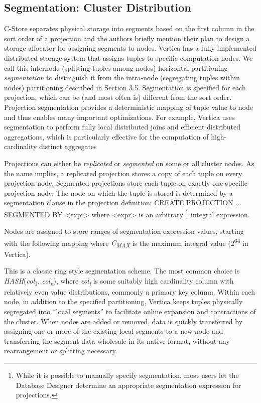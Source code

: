 \documentclass[a4paper,12pt,notitlepage,twoside,openright]{article}
\begin{document}
\hypertarget{segmentation-cluster-distribution}{%
\subsection{Segmentation: Cluster
Distribution}\label{segmentation-cluster-distribution}}

C-Store separates physical storage into segments based on the first
column in the sort order of a projection and the authors briefly mention
their plan to design a storage allocator for assigning segments to
nodes. Vertica has a fully implemented distributed storage system that
assigns tuples to specific computation nodes. We call this internode
(splitting tuples among nodes) horizontal partitioning
\emph{segmentation} to distinguish it from the intra-node (segregating
tuples within nodes) partitioning described in Section 3.5. Segmentation
is specified for each projection, which can be (and most often is)
different from the sort order. Projection segmentation provides a
deterministic mapping of tuple value to node and thus enables many
important optimizations. For example, Vertica uses segmentation to
perform fully local distributed joins and efficient distributed
aggregations, which is particularly effective for the computation of
high-cardinality distinct aggregates

Projections can either be \emph{replicated} or \emph{segmented} on some
or all cluster nodes. As the name implies, a replicated projection
stores a copy of each tuple on every projection node. Segmented
projections store each tuple on exactly one specific projection node.
The node on which the tuple is stored is determined by a segmentation
clause in the projection definition: CREATE PROJECTION ... SEGMENTED BY
\textless expr\textgreater{} where \textless expr\textgreater{} is an
arbitrary \footnote{While it is possible to manually specify
  segmentation, most users let the Database Designer determine an
  appropriate segmentation expression for projections.} integral
expression.

Nodes are assigned to store ranges of segmentation expression values,
starting with the following mapping where \emph{C\textsubscript{MAX }}is
the maximum integral value (2\textsuperscript{64} in Vertica).

This is a classic ring style segmentation scheme. The most common choice
is
\emph{HASH}(\emph{col}\textsubscript{1}\emph{..col\textsubscript{n}}),
where \emph{col\textsubscript{i }}is some suitably high cardinality
column with relatively even value distributions, commonly a primary key
column. Within each node, in addition to the specified partitioning,
Vertica keeps tuples physically segregated into ``local segments'' to
facilitate online expansion and contractions of the cluster. When nodes
are added or removed, data is quickly transferred by assigning one or
more of the existing local segments to a new node and transferring the
segment data wholesale in its native format, without any rearrangement
or splitting necessary.
\end{document}
